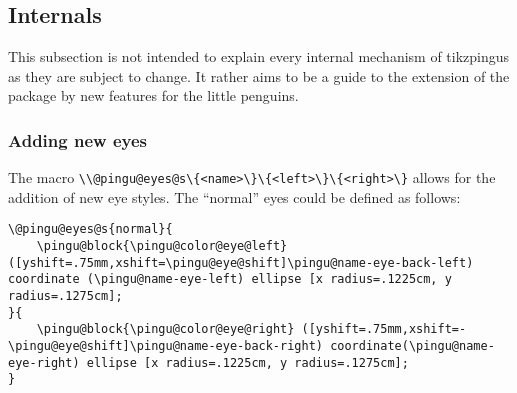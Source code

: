 \documentclass[parskip=half,english,numbers=noenddot,footnotes=nomultiple,oneside]{scrartcl}
\let\say\enquote
\def\ltex#1{\lstinline[style=lstpingu,language=pinguinternallang]'#1'}
\begin{document}
\subsection{Internals}
This subsection is not intended to explain every internal mechanism of tikzpingus as they are subject to change. It rather aims to be a guide to the extension of the package by new features for the little penguins.

\subsubsection{Adding new eyes}
The macro \ltex{\\@pingu@eyes@s\{<name>\}\{<left>\}\{<right>\}} allows for the addition of new eye styles.
The \say{normal} eyes could be defined as follows:
\begin{lstlisting}[style=lstpingu,language={pinguinternallang}]
\@pingu@eyes@s{normal}{
	\pingu@block{\pingu@color@eye@left} ([yshift=.75mm,xshift=\pingu@eye@shift]\pingu@name-eye-back-left) coordinate (\pingu@name-eye-left) ellipse [x radius=.1225cm, y radius=.1275cm];
}{
	\pingu@block{\pingu@color@eye@right} ([yshift=.75mm,xshift=-\pingu@eye@shift]\pingu@name-eye-back-right) coordinate(\pingu@name-eye-right) ellipse [x radius=.1225cm, y radius=.1275cm];
}
\end{lstlisting}
\printindex
\end{document}
